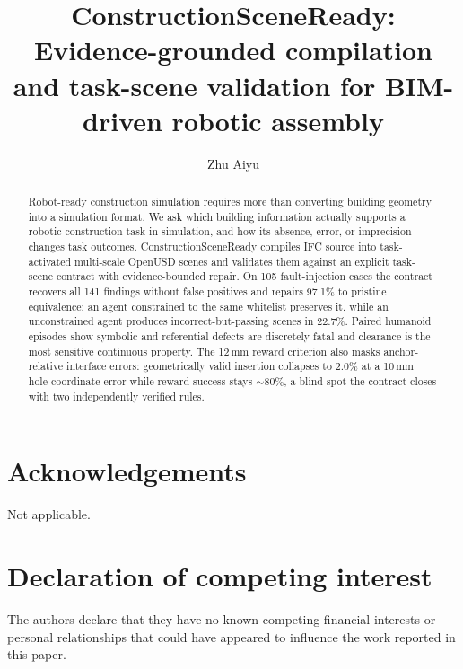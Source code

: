 \documentclass[preprint,12pt]{elsarticle}
\begin{document}
\begin{frontmatter}

\title{ConstructionSceneReady: Evidence-grounded compilation and task-scene
validation for BIM-driven robotic assembly}

\author[aff1]{Zhu Aiyu}


\begin{abstract}
Robot-ready construction simulation requires more than converting building
geometry into a simulation format. We ask which building information actually
supports a robotic construction task in simulation, and how its absence,
error, or imprecision changes task outcomes. ConstructionSceneReady compiles
IFC source into task-activated multi-scale OpenUSD scenes and validates them
against an explicit task-scene contract with evidence-bounded repair. On 105
fault-injection cases the contract recovers all 141 findings without false
positives and repairs 97.1\% to pristine equivalence; an agent constrained to
the same whitelist preserves it, while an unconstrained agent produces
incorrect-but-passing scenes in 22.7\%. Paired humanoid episodes show
symbolic and referential defects are discretely fatal and clearance is the
most sensitive continuous property. The 12\,mm reward criterion also masks
anchor-relative interface errors: geometrically valid insertion collapses to
2.0\% at a 10\,mm hole-coordinate error while reward success stays
${\sim}80\%$, a blind spot the contract closes with two independently
verified rules.
\end{abstract}

\end{frontmatter}

\section*{Acknowledgements}
Not applicable.

\section*{Declaration of competing interest}
The authors declare that they have no known competing financial interests or
personal relationships that could have appeared to influence the work reported
in this paper.
\end{document}
